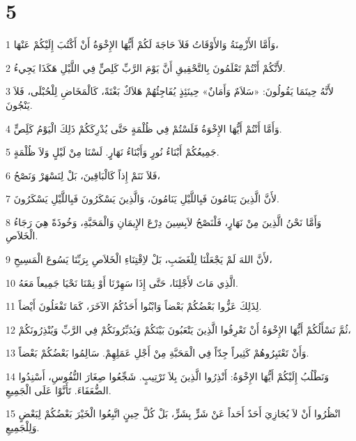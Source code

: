 \chapter{5}

\par 1 وَأَمَّا الأَزْمِنَةُ وَالأَوْقَاتُ فَلاَ حَاجَةَ لَكُمْ أَيُّهَا الإِخْوَةُ أَنْ أَكْتُبَ إِلَيْكُمْ عَنْهَا،
\par 2 لأَنَّكُمْ أَنْتُمْ تَعْلَمُونَ بِالتَّحْقِيقِ أَنَّ يَوْمَ الرَّبِّ كَلِصٍّ فِي اللَّيْلِ هَكَذَا يَجِيءُ.
\par 3 لأَنَّهُ حِينَمَا يَقُولُونَ: «سَلاَمٌ وَأَمَانٌ» حِينَئِذٍ يُفَاجِئُهُمْ هَلاَكٌ بَغْتَةً، كَالْمَخَاضِ لِلْحُبْلَى، فَلاَ يَنْجُونَ.
\par 4 وَأَمَّا أَنْتُمْ أَيُّهَا الإِخْوَةُ فَلَسْتُمْ فِي ظُلْمَةٍ حَتَّى يُدْرِكَكُمْ ذَلِكَ الْيَوْمُ كَلَِصٍّ.
\par 5 جَمِيعُكُمْ أَبْنَاءُ نُورٍ وَأَبْنَاءُ نَهَارٍ. لَسْنَا مِنْ لَيْلٍ وَلاَ ظُلْمَةٍ.
\par 6 فَلاَ نَنَمْ إِذاً كَالْبَاقِينَ، بَلْ لِنَسْهَرْ وَنَصْحُ،
\par 7 لأَنَّ الَّذِينَ يَنَامُونَ فَبِاللَّيْلِ يَنَامُونَ، وَالَّذِينَ يَسْكَرُونَ فَبِاللَّيْلِ يَسْكَرُونَ.
\par 8 وَأَمَّا نَحْنُ الَّذِينَ مِنْ نَهَارٍ، فَلْنَصْحُ لاَبِسِينَ دِرْعَ الإِيمَانِ وَالْمَحَبَّةِ، وَخُوذَةً هِيَ رَجَاءُ الْخَلاَصِ.
\par 9 لأَنَّ اللهَ لَمْ يَجْعَلْنَا لِلْغَضَبِ، بَلْ لاِقْتِنَاءِ الْخَلاَصِ بِرَبِّنَا يَسُوعَ الْمَسِيحِ،
\par 10 الَّذِي مَاتَ لأَجْلِنَا، حَتَّى إِذَا سَهِرْنَا أَوْ نِمْنَا نَحْيَا جَمِيعاً مَعَهُ.
\par 11 لِذَلِكَ عَزُّوا بَعْضُكُمْ بَعْضاً وَابْنُوا أَحَدُكُمُ الآخَرَ، كَمَا تَفْعَلُونَ أَيْضاً.
\par 12 ثُمَّ نَسْأَلُكُمْ أَيُّهَا الإِخْوَةُ أَنْ تَعْرِفُوا الَّذِينَ يَتْعَبُونَ بَيْنَكُمْ وَيُدَبِّرُونَكُمْ فِي الرَّبِّ وَيُنْذِرُونَكُمْ،
\par 13 وَأَنْ تَعْتَبِرُوهُمْ كَثِيراً جِدّاً فِي الْمَحَبَّةِ مِنْ أَجْلِ عَمَلِهِمْ. سَالِمُوا بَعْضُكُمْ بَعْضاً.
\par 14 وَنَطْلُبُ إِلَيْكُمْ أَيُّهَا الإِخْوَةُ: أَنْذِرُوا الَّذِينَ بِلاَ تَرْتِيبٍ. شَجِّعُوا صِغَارَ النُّفُوسِ، أَسْنِدُوا الضُّعَفَاءَ. تَأَنَّوْا عَلَى الْجَمِيعِ.
\par 15 انْظُرُوا أَنْ لاَ يُجَازِيَ أَحَدٌ أَحَداً عَنْ شَرٍّ بِشَرٍّ، بَلْ كُلَّ حِينٍ اتَّبِعُوا الْخَيْرَ بَعْضُكُمْ لِبَعْضٍ وَلِلْجَمِيعِ.
